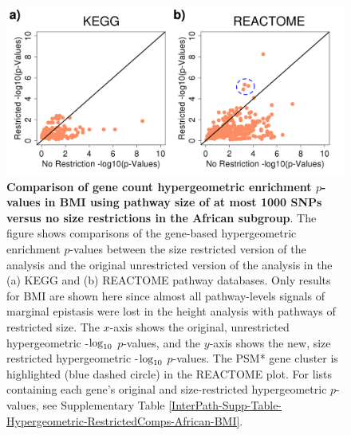 \documentclass[12pt,a4paper]{article}
\def\log{{\rm log}}
\begin{document}
\begin{figure}[htbp]
\centering
\includegraphics[scale=.4]{Images/Main/InterPath_Main_Figure_Hypergeometric_RestrictedComps_African_BMI_vs3.png}
\caption[TBD]{\textbf{Comparison of gene count hypergeometric enrichment $p$-values in BMI using pathway size of at most 1000 SNPs versus no size restrictions in the African subgroup}. The figure shows comparisons of the gene-based hypergeometric enrichment $p$-values between the size restricted version of the analysis and the original unrestricted version of the analysis in the (a) KEGG and (b) REACTOME pathway databases. Only results for BMI are shown here since almost all pathway-levels signals of marginal epistasis were lost in the height analysis with pathways of restricted size. The $x$-axis shows the original, unrestricted hypergeometric -$\log_{10}$ $p$-values, and the $y$-axis shows the new, size restricted hypergeometric -$\log_{10}$ $p$-values. The PSM* gene cluster is highlighted (blue dashed circle) in the REACTOME plot. For lists containing each gene's original and  size-restricted hypergeometric $p$-values, see Supplementary Table \ref{InterPath-Supp-Table-Hypergeometric-RestrictedComps-African-BMI}.}
\label{InterPath-Main-Figure-Hypergeometric-RestrictedComps-African-BMI}
\end{figure}
\clearpage
\end{document}
